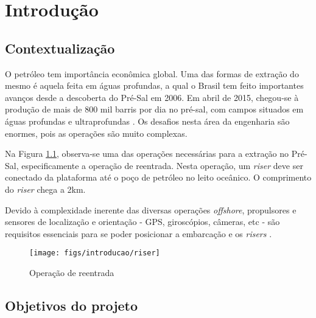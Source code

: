  


\chapter{Introdução}

\label{CapIntro}



\section{Contextualização}

O petróleo tem importância econômica global. Uma das formas de extração do mesmo é aquela feita em águas profundas, a qual o Brasil tem feito importantes avanços desde a descoberta do Pré-Sal em 2006. Em abril de 2015, chegou-se à produção de mais de 800 mil barris por dia no pré-sal, com campos situados em águas profundas e ultraprofundas \cite{preSal}. Os desafios nesta área da engenharia são enormes, pois as operações são muito complexas.

Na Figura \ref{riser}, observa-se uma das operações necessárias para a extração no Pré-Sal, especificamente a operação de reentrada. Nesta operação, um \textit{riser} deve ser conectado da plataforma até o poço de petróleo no leito oceânico. O comprimento do \textit{riser} chega a 2km.

Devido à complexidade inerente das diversas operações \textit{offshore}, propulsores e sensores de localização e orientação - GPS, giroscópios, câmeras, etc - são requisitos essenciais para se poder posicionar a embarcação e os \textit{risers} \cite{redytton}.

\begin{figure}[ht!]
\centering
  \texttt{[image: figs/introducao/riser]}
  \caption{Operação de reentrada \cite{eugenioASME2012}\label{riser}}
\end{figure}


\section{Objetivos do projeto}

